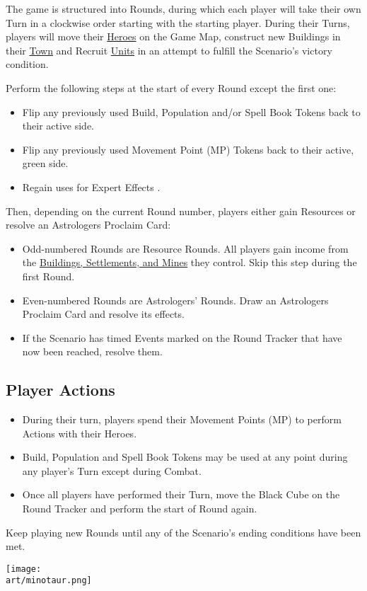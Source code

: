 
\begin{multicols*}{2}

The game is structured into Rounds, during which each player will take their own Turn in a clockwise order starting with the starting player.
During their Turns, players will move their \hyperlink{Heroes}{Heroes} on the Game Map, construct new Buildings in their \hyperlink{Town}{Town} and Recruit \hyperlink{Units}{Units} in an attempt to fulfill the Scenario's victory condition.\par
Perform the following steps at the start of every Round except the first one:
\begin{itemize}
  \item Flip any previously used Build, Population and/or Spell Book Tokens back to their active side.
  \item Flip any previously used Movement Point (MP) Tokens back to their active, green side.
  \item Regain uses for Expert Effects .
\end{itemize}
Then, depending on the current Round number, players either gain Resources or resolve an Astrologers Proclaim Card:
\begin{itemize}
  \item Odd-numbered Rounds are Resource Rounds.
    All players gain income from the \hyperlink{Mines}{Buildings, Settlements, and Mines} they control.
    Skip this step during the first Round.
  \item Even-numbered Rounds are Astrologers' Rounds.
    Draw an Astrologers Proclaim Card and resolve its effects.
  \item If the Scenario has timed Events marked on the Round Tracker that have now been reached, resolve them.
\end{itemize}
\subsection*{Player Actions}
\begin{itemize}
  \item During their turn, players spend their Movement Points (MP) to perform Actions with their Heroes.
  \item Build, Population and Spell Book Tokens may be used at any point during any player's Turn except during Combat.
  \item Once all players have performed their Turn, move the Black Cube on the Round Tracker and perform the start of Round again.
\end{itemize}
Keep playing new Rounds until any of the Scenario's ending conditions have been met.

\vfill
\hspace{2em}
\texttt{[image: \\art/minotaur.png]}
\vfill

\end{multicols*}
